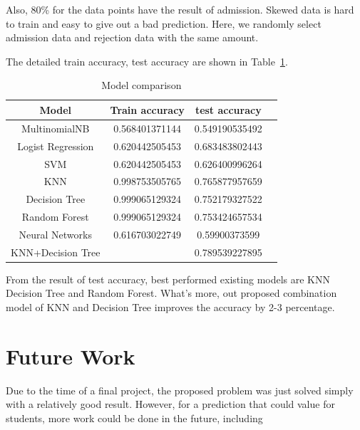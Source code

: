\documentclass{article}
\begin{document}
Also, 80\% for the data points have the result of admission. Skewed data is hard to train and easy to give out a bad prediction. Here, we randomly select admission data and rejection data with the same amount.

The detailed train accuracy, test accuracy are shown in Table~\ref{tab: Model_comparison}.

\begin{table}[htbp]
\centering
\begin{tabular}{cccc}
    \hline
    Model & Train accuracy & test accuracy\\
    \hline
    MultinomialNB & 0.568401371144 & 0.549190535492\\
    \hline
    Logist Regression & 0.620442505453 & 0.683483802443\\
    \hline
    SVM & 0.620442505453 & 0.626400996264\\
    \hline
    KNN & 0.998753505765 & 0.765877957659\\
    \hline
    Decision Tree & 0.999065129324 & 0.752179327522\\
    \hline
    Random Forest & 0.999065129324 & 0.753424657534\\
    \hline
    Neural Networks & 0.616703022749 & 0.59900373599\\
    \hline
    KNN+Decision Tree &  & 0.789539227895\\
    \hline
    \end{tabular}
\caption{Model comparison}
\label{tab: Model_comparison}
\end{table}

From the result of test accuracy, best performed existing models are KNN Decision Tree and Random Forest. What's more, out proposed combination model of KNN and Decision Tree improves the accuracy by 2-3 percentage.

\section{Future Work}

Due to the time of a final project, the proposed problem was just solved simply with a relatively good result. However, for a prediction that could value for students, more work could be done in the future, including
\end{document}
